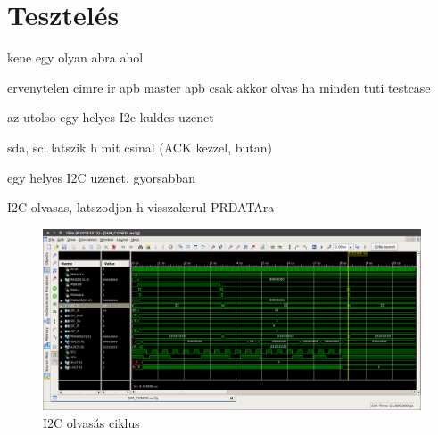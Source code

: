 \chapter{Tesztelés}
\label{sec:testing}


kene egy olyan abra ahol

ervenytelen cimre ir apb master
apb csak akkor olvas ha minden tuti testcase

az utolso egy helyes I2c kuldes uzenet

sda, scl latszik h mit csinal (ACK kezzel, butan)

egy helyes I2C uzenet, gyorsabban

I2C olvasas, latszodjon h visszakerul PRDATAra
\begin{figure}[ht!]
    \includegraphics[width=\textwidth]{figures/I2C_R4.png}
    \caption{I2C olvasás ciklus}
    \label{}
\end{figure}
